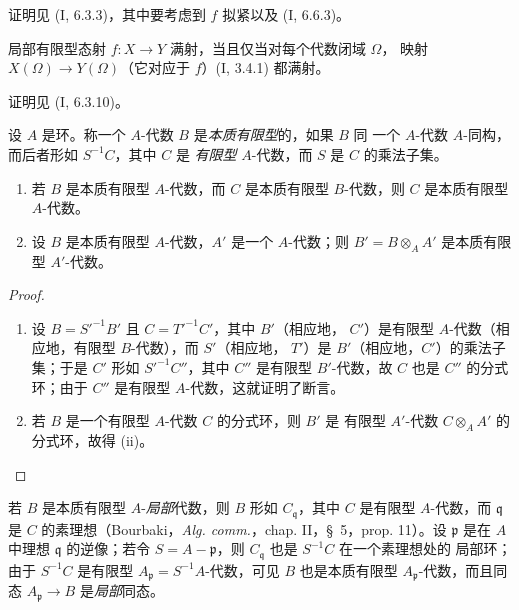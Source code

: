 证明见 (I, 6.3.3)，其中要考虑到 $f$ 拟紧以及 (I, 6.6.3)。

\begin{proposition}[1.3.7]
\label{IV.1.3.7-fr}
局部有限型态射 $f:X\to Y$ 满射，当且仅当对每个代数闭域 $\Omega$，
映射 $X(\Omega)\to Y(\Omega)$（它对应于 $f$）(I, 3.4.1) 都满射。
\end{proposition}

证明见 (I, 6.3.10)。

\begin{env}[1.3.8]
\label{IV.1.3.8-fr}
设 $A$ 是环。称一个 $A$-代数 $B$ 是\emph{本质有限型}的，如果 $B$ 同
一个 $A$-代数 $A$-同构，而后者形如 $S^{-1}C$，其中 $C$ 是
\emph{有限型} $A$-代数，而 $S$ 是 $C$ 的乘法子集。
\end{env}

\par\medskip\noindent
\begin{proposition}[1.3.9]
\label{IV.1.3.9-fr}
\begin{enumerate}
  \item[(i)] 若 $B$ 是本质有限型 $A$-代数，而 $C$ 是本质有限型
  $B$-代数，则 $C$ 是本质有限型 $A$-代数。
  \item[(ii)] 设 $B$ 是本质有限型 $A$-代数，$A'$ 是一个 $A$-代数；则
  $B'=B\otimes_AA'$ 是本质有限型 $A'$-代数。
\end{enumerate}
\end{proposition}

\begin{proof}
\begin{enumerate}
  \item[(i)] 设 $B=S'^{-1}B'$ 且 $C=T'^{-1}C'$，其中 $B'$（相应地，
  $C'$）是有限型 $A$-代数（相应地，有限型 $B$-代数），而 $S'$（相应地，
  $T'$）是 $B'$（相应地，$C'$）的乘法子集；于是 $C'$ 形如
  $S'^{-1}C''$，其中 $C''$ 是有限型 $B'$-代数，故 $C$ 也是 $C''$
  的分式环；由于 $C''$ 是有限型 $A$-代数，这就证明了断言。
  \item[(ii)] 若 $B$ 是一个有限型 $A$-代数 $C$ 的分式环，则 $B'$ 是
  有限型 $A'$-代数 $C\otimes_AA'$ 的分式环，故得 (ii)。
\end{enumerate}
\end{proof}


\begin{env}[1.3.10]
\label{IV.1.3.10-fr}
若 $B$ 是本质有限型 $A$-\emph{局部}代数，则 $B$ 形如
$C_{\mathfrak q}$，其中 $C$ 是有限型 $A$-代数，而 $\mathfrak q$ 是 $C$
的素理想（Bourbaki，\emph{Alg. comm.}，chap. II，\S~5，prop. 11）。设
$\mathfrak p$ 是在 $A$ 中理想 $\mathfrak q$ 的逆像；若令
$S=A-\mathfrak p$，则 $C_{\mathfrak q}$ 也是 $S^{-1}C$ 在一个素理想处的
局部环；由于 $S^{-1}C$ 是有限型
$A_{\mathfrak p}=S^{-1}A$-代数，可见 $B$ 也是本质有限型
$A_{\mathfrak p}$-代数，而且同态 $A_{\mathfrak p}\to B$ 是\emph{局部}同态。
\end{env}

